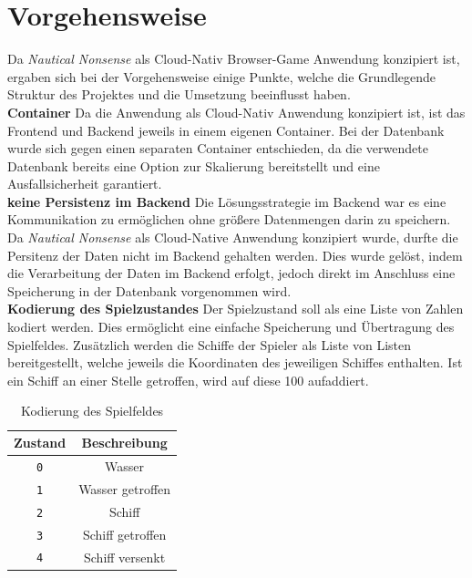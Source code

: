 \documentclass[a4paper, 10pt, conference]{IEEEtran}
\begin{document}
\section{Vorgehensweise}\label{sec:vorgehensweise}
Da \textit{Nautical Nonsense} als Cloud-Nativ Browser-Game Anwendung konzipiert ist, ergaben sich bei der Vorgehensweise einige Punkte, welche die Grundlegende Struktur des Projektes und die Umsetzung beeinflusst haben.\\

\textbf{Container} Da die Anwendung als Cloud-Nativ Anwendung konzipiert ist, ist das Frontend und Backend jeweils in einem eigenen Container. Bei der Datenbank wurde sich gegen einen separaten Container entschieden, da die verwendete Datenbank bereits eine Option zur Skalierung bereitstellt und eine Ausfallsicherheit garantiert. \\

\textbf{keine Persistenz im Backend} Die Lösungsstrategie im Backend war es eine Kommunikation zu ermöglichen ohne größere Datenmengen darin zu speichern. Da \textit{Nautical Nonsense} als Cloud-Native Anwendung konzipiert wurde, durfte die Persitenz der Daten nicht im Backend gehalten werden. Dies wurde gelöst, indem die Verarbeitung der Daten im Backend erfolgt, jedoch direkt im Anschluss eine Speicherung in der Datenbank vorgenommen wird. \\

\textbf{Kodierung des Spielzustandes} 
Der Spielzustand soll als eine Liste von Zahlen kodiert werden. Dies ermöglicht eine einfache Speicherung und Übertragung des Spielfeldes. 
Zusätzlich werden die Schiffe der Spieler als Liste von Listen bereitgestellt, welche jeweils die Koordinaten des jeweiligen Schiffes enthalten. Ist ein Schiff an einer Stelle getroffen, wird auf diese 100 aufaddiert. \\

\begin{table}[h!]
    \begin{center}
        \caption{Kodierung des Spielfeldes}
        \label{tab:gamefield}
        \begin{tabular}{|c|c|}
            \textbf{Zustand} & \textbf{Beschreibung}\\
            \hline
            \texttt{0}	& Wasser\\
            \texttt{1}	& Wasser getroffen\\
            \texttt{2}	& Schiff\\
            \texttt{3}	& Schiff getroffen\\
            \texttt{4}	& Schiff versenkt\\
        \end{tabular}
    \end{center}
\end{table}
\end{document}
